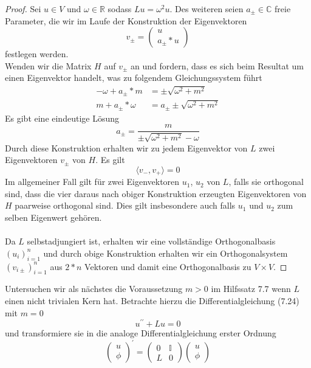 \documentclass[11pt,a4paper,leqno]{report}
\numberwithin{equation}{chapter}
\begin{document}
\begin{proof}
	Sei $u\in V$ und $\omega\in \mathbb{R}$ sodass $Lu = \omega^2 u$. Des weiteren seien $a_\pm\in\mathbb{C}$ freie Parameter, die wir im Laufe der Konstruktion der Eigenvektoren 
	\begin{equation*}
		v_\pm=\begin{pmatrix}
			u \\ a_\pm*u
		\end{pmatrix}
	\end{equation*}
festlegen werden.\\
	Wenden wir die Matrix $H$ auf $v_\pm$ an und fordern, dass es sich beim Resultat um einen Eigenvektor handelt, was zu folgendem Gleichungssystem f\"uhrt
	\begin{align*}
		-\omega + a_\pm*m &= \pm\sqrt{\omega^2 + m^2}\\
		m + a_\pm*\omega &= a_\pm\pm\sqrt{\omega^2 + m^2}
	\end{align*}
	Es gibt eine eindeutige L\"osung
	\begin{equation*}
		a_\pm = \frac{m}{\pm\sqrt{\omega^2 + m^2}-\omega}
	\end{equation*} 
	Durch diese Konstruktion erhalten wir zu jedem Eigenvektor von $L$ zwei Eigenvektoren $v_\pm$ von $H$. Es gilt
	\begin{equation*}
		\langle v_-, v_+\rangle=0 
	\end{equation*}
	Im allgemeiner Fall gilt f\"ur zwei Eigenvektoren $u_1$, $u_2$ von $L$, falls sie orthogonal sind, dass
	die vier daraus nach obiger Konstruktion erzeugten Eigenvektoren von $H$ paarweise orthogonal sind. Dies gilt insbesondere auch falls $u_1$ und $u_2$ zum selben Eigenwert geh\"oren.\\
	\\
	Da $L$ selbstadjungiert ist, erhalten wir eine vollst\"andige Orthogonalbasis $(u_i)_{i=1}^n$ und durch obige Konstruktion erhalten wir ein Orthogonalsystem $(v_{i\pm})_{i=1}^n$ aus $2*n$ Vektoren und damit eine Orthogonalbasis zu $V\times V$.
\end{proof}
\noindent
Untersuchen wir als n\"achstes die Voraussetzung $m>0$ im Hilfssatz 7.7 wenn $L$ einen nicht trivialen Kern hat.
Betrachte hierzu die Differentialgleichung (7.24) mit $m=0$
\begin{equation}
	u^{\prime \prime} + Lu =0
\end{equation}
und transformiere sie in die analoge Differentialgleichung erster Ordnung
\begin{equation}
	\begin{pmatrix}
		u  \\ \phi 
	\end{pmatrix}^\prime=
	\begin{pmatrix}
		0 & \mathbb{I} \\ 
		L & 0
	\end{pmatrix}
	\begin{pmatrix}
		u  \\ \phi 
	\end{pmatrix}
\end{equation}
\end{document}
